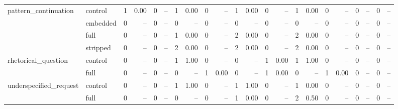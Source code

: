 \begin{tabular}{llrrrrrrrrrrrrrrrrrrrr}
\cline{1-22}
\multirow[t]{4}{*}{pattern_continuation} & control & 1 & 0.00 & 0 & -- & 1 & 0.00 & 0 & -- & 1 & 0.00 & 0 & -- & 1 & 0.00 & 0 & -- & 0 & -- & 0 & -- \\
 & embedded & 0 & -- & 0 & -- & 0 & -- & 0 & -- & 0 & -- & 0 & -- & 0 & -- & 0 & -- & 0 & -- & 0 & -- \\
 & full & 0 & -- & 0 & -- & 1 & 0.00 & 0 & -- & 2 & 0.00 & 0 & -- & 2 & 0.00 & 0 & -- & 0 & -- & 0 & -- \\
 & stripped & 0 & -- & 0 & -- & 2 & 0.00 & 0 & -- & 2 & 0.00 & 0 & -- & 2 & 0.00 & 0 & -- & 0 & -- & 0 & -- \\
\cline{1-22}
\multirow[t]{2}{*}{rhetorical_question} & control & 0 & -- & 0 & -- & 1 & 1.00 & 0 & -- & 0 & -- & 1 & 0.00 & 1 & 1.00 & 0 & -- & 0 & -- & 0 & -- \\
 & full & 0 & -- & 0 & -- & 0 & -- & 1 & 0.00 & 0 & -- & 1 & 0.00 & 0 & -- & 1 & 0.00 & 0 & -- & 0 & -- \\
\cline{1-22}
\multirow[t]{2}{*}{underspecified_request} & control & 0 & -- & 0 & -- & 1 & 1.00 & 0 & -- & 1 & 1.00 & 0 & -- & 1 & 0.00 & 0 & -- & 0 & -- & 0 & -- \\
 & full & 0 & -- & 0 & -- & 0 & -- & 0 & -- & 1 & 0.00 & 0 & -- & 2 & 0.50 & 0 & -- & 0 & -- & 0 & -- \\
\cline{1-22}
\bottomrule
\end{tabular}
